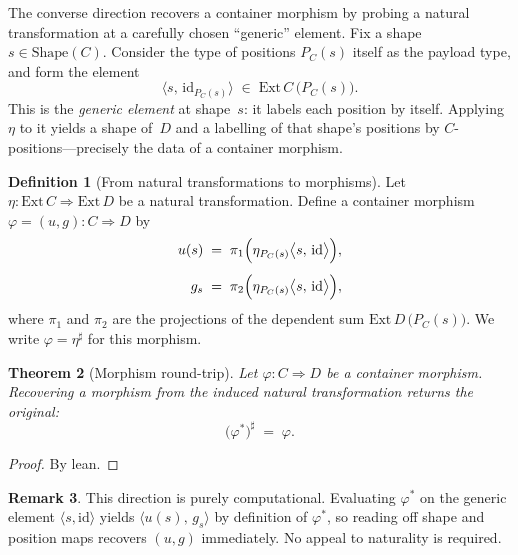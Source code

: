 \documentclass[11pt,a4paper]{article}
\theoremstyle{plain}
\newtheorem{theorem}{Theorem}[section]
\theoremstyle{definition}
\newtheorem{definition}[theorem]{Definition}
\newtheorem{remark}[theorem]{Remark}
\newcommand{\Ext}{\mathrm{Ext}}
\newcommand{\Shape}{\mathrm{Shape}}
\newcommand{\id}{\mathrm{id}}
\begin{document}
The converse direction recovers a container morphism by probing a natural
transformation at a carefully chosen ``generic'' element. Fix a shape
$s \in \Shape(C)$. Consider the type of positions $P_C(s)$ itself as the
payload type, and form the element
\begin{equation}
  \bigl\langle s,\, \id_{P_C(s)} \bigr\rangle
  \;\in\;
  \Ext\,C\,\bigl(P_C(s)\bigr).
\end{equation}
This is the \emph{generic element} at shape~$s$: it labels each position by
itself. Applying $\eta$ to it yields a shape of~$D$ and a labelling of that
shape's positions by $C$-positions---precisely the data of a container
morphism.

\begin{definition}[From natural transformations to morphisms]\label{def:backward}
Let $\eta : \Ext\,C \Longrightarrow \Ext\,D$ be a natural transformation.
Define a container morphism $\varphi = (u,g) : C \Rightarrow D$ by
\begin{align}
  u(s)
  &\;=\;
  \pi_1\Bigl(
    \eta_{P_C(s)}\bigl\langle s,\, \id \bigr\rangle
  \Bigr), \\[4pt]
  g_s
  &\;=\;
  \pi_2\Bigl(
    \eta_{P_C(s)}\bigl\langle s,\, \id \bigr\rangle
  \Bigr),
\end{align}
where $\pi_1$ and $\pi_2$ are the projections of the dependent sum
$\Ext\,D\,\bigl(P_C(s)\bigr)$. We write $\varphi = \eta^\sharp$ for this
morphism.
\end{definition}

\begin{theorem}[Morphism round-trip]\label{thm:morphism-roundtrip}
Let $\varphi : C \Rightarrow D$ be a container morphism. Recovering a morphism
from the induced natural transformation returns the original:
\begin{equation}
  \bigl(\varphi^*\bigr)^\sharp \;=\; \varphi.
\end{equation}
\end{theorem}

\begin{proof}
By lean.
\end{proof}

\begin{remark}
This direction is purely computational. Evaluating $\varphi^*$ on the generic
element $\langle s, \id \rangle$ yields $\langle u(s),\, g_s \rangle$ by
definition of $\varphi^*$, so reading off shape and position maps recovers
$(u,g)$ immediately. No appeal to naturality is required.
\end{remark}
\end{document}
